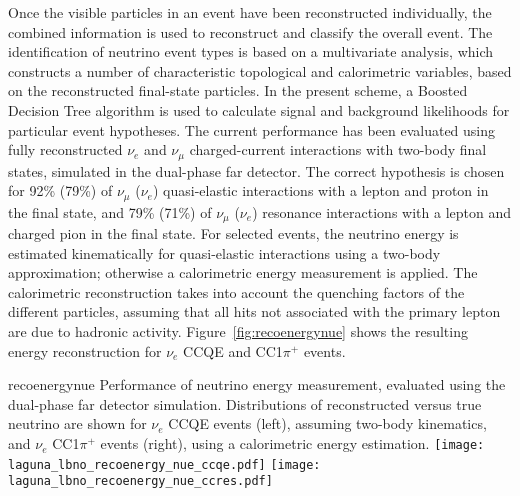 Once the visible particles in an event have been reconstructed
individually, the combined information is used to reconstruct and
classify the overall event.  The identification of neutrino event
types is based on a multivariate
analysis\cite{Back:2013cva,WA105_TDR,LAGUNA-LBNO-deliv,LAGUNA-LBNO-EOI},
which constructs a number of characteristic topological and
calorimetric variables, based on the reconstructed final-state
particles. In the present scheme, a Boosted Decision Tree algorithm is
used to calculate signal and background likelihoods for particular
event hypotheses. The current performance has been evaluated using
fully reconstructed $\nu_{e}$ and $\nu_{\mu}$ charged-current
interactions with two-body final states, simulated in the dual-phase
far detector\cite{LAGUNA-LBNO-deliv}.  The correct hypothesis is
chosen for 92\% (79\%) of $\nu_{\mu}$ ($\nu_{e}$) quasi-elastic
interactions with a lepton and proton in the final state, and 79\%
(71\%) of $\nu_{\mu}$ ($\nu_{e}$) resonance interactions with a lepton
and charged pion in the final state.  For selected events, the
neutrino energy is estimated kinematically for quasi-elastic
interactions using a two-body approximation; otherwise a
calorimetric energy measurement is applied.  The calorimetric
reconstruction takes into account the quenching factors of the
different particles, assuming that all hits not associated with the
primary lepton are due to hadronic activity.
Figure~\ref{fig:recoenergynue} shows the resulting energy
reconstruction for $\nu_e$ CCQE and CC1$\pi^{+}$ events.
\begin{cdrfigure}{recoenergynue}
{Performance of neutrino energy measurement, evaluated using the dual-phase far detector simulation. 
Distributions of reconstructed versus true neutrino are shown for $\nu_{e}$ CCQE events (left),
assuming two-body kinematics, and $\nu_{e}$  CC1$\pi^{+}$ events (right),
using a calorimetric energy estimation.}
\texttt{[image: laguna\_lbno\_recoenergy\_nue\_ccqe.pdf]}
\texttt{[image: laguna\_lbno\_recoenergy\_nue\_ccres.pdf]}
\end{cdrfigure}

